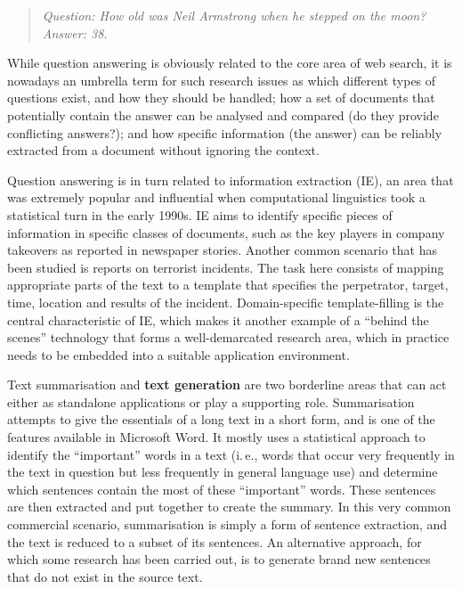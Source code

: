 \documentclass[]{../../metanetpaper}
\begin{document}
\begin{multicols}{2}
\begin{quote}
\textit{Question: How old was Neil Armstrong when he stepped on the moon?}\\
\textit{Answer: 38.}
\end{quote}

While question answering is obviously related to the core area of web search, it is nowadays an umbrella term for such research issues as which different types of questions exist, and how they should be handled; how a set of documents that potentially contain the answer can be analysed and compared (do they provide conflicting answers?); and how specific information (the answer) can be reliably extracted from a document without ignoring the context. 


Question answering is in turn related to information extraction (IE), an area that was extremely popular and influential when computational linguistics took a statistical turn in the early 1990s. IE aims to identify specific pieces of information in specific classes of documents, such as the key players in company takeovers as reported in newspaper stories. Another common scenario that has been studied is reports on terrorist incidents. The task here consists of mapping appropriate parts of the text to a template that specifies the perpetrator, target, time, location and results of the incident. Domain-specific template-filling is the central characteristic of IE, which makes it another example of a “behind the scenes” technology that forms a well-demarcated research area, which in practice needs to be embedded into a suitable application environment. 

    Text summarisation and \textbf{text generation} are two borderline areas that can act either as standalone applications or play a supporting role. Summarisation attempts to give the essentials of a long text in a short form, and is one of the features available in Microsoft Word. It mostly uses a statistical approach to identify the “important” words in a text (i.\,e., words that occur very frequently in the text in question but less frequently in general language use) and determine which sentences contain the most of these “important” words. These sentences are then extracted and put together to create the summary. In this very common commercial scenario, summarisation is simply a form of sentence extraction, and the text is reduced to a subset of its sentences. An alternative approach, for which some research has been carried out, is to generate brand new sentences that do not exist in the source text. 


\end{multicols}
\end{document}
